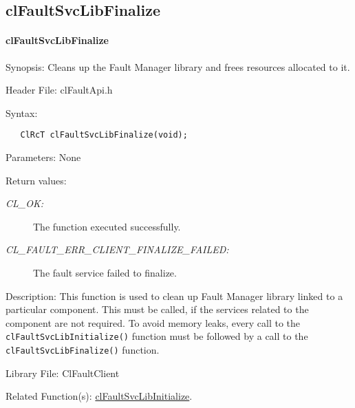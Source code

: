 \begin{flushleft}
\subsection{clFaultSvcLibFinalize}
\hypertarget{pagefm104}{}\paragraph{cl\-Fault\-Svc\-Lib\-Finalize}\label{pagefm104}
\begin{Desc}
\item[Synopsis:]Cleans up the Fault Manager library and frees resources allocated to it.\end{Desc}
\begin{Desc}
\item[Header File:]clFaultApi.h\end{Desc}
\begin{Desc}
\item[Syntax:]

\footnotesize\begin{verbatim}   ClRcT clFaultSvcLibFinalize(void);
\end{verbatim}
\normalsize
\end{Desc}
\begin{Desc}
\item[Parameters:]None\end{Desc}
\begin{Desc}
\item[Return values:]
\begin{description}
\item[{\em CL\_\-OK:}]The function executed successfully. 
\item[{\em CL\_\-FAULT\_\-ERR\_\-CLIENT\_\-FINALIZE\_\-FAILED:}]The fault service failed to finalize.\end{description}
\end{Desc}
\begin{Desc}
\item[Description:]This function is used to clean up Fault Manager library linked to a particular component. This must be called, if the 
services related to the component are not required. To avoid memory leaks, every call to the
{\tt{clFaultSvcLibInitialize()}} function must be followed by a call to the {\tt{clFaultSvcLibFinalize()}} function.\end{Desc}
\begin{Desc}
\item[Library File:]Cl\-Fault\-Client\end{Desc}
\begin{Desc}
\item[Related Function(s):]\hyperlink{pagefm103}{cl\-Fault\-Svc\-Lib\-Initialize}. \end{Desc}
\newpage


\end{flushleft}
